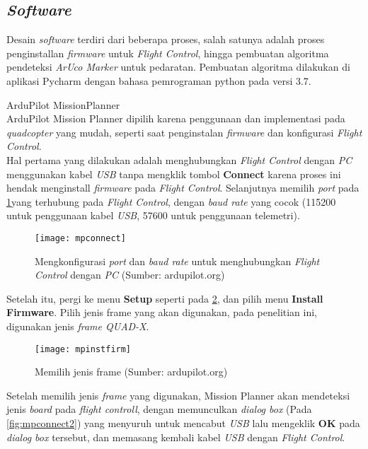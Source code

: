 \subsection{\textit{Software}}
Desain \textit{software} terdiri dari beberapa proses, salah satunya adalah proses  penginstallan \textit{firmware} untuk \textit{Flight Control}, hingga pembuatan algoritma pendeteksi \textit{ArUco Marker} untuk pedaratan. Pembuatan algoritma dilakukan di aplikasi Pycharm dengan bahasa pemrograman python pada versi 3.7.
\begin{packed_enum}
	\item ArduPilot MissionPlanner
	\\ ArduPilot Mission Planner dipilih karena penggunaan dan implementasi pada \textit{quadcopter} yang mudah, seperti saat penginstalan \textit{firmware} dan konfigurasi \textit{Flight Control}.
	\\ Hal pertama yang dilakukan adalah menghubungkan \textit{Flight Control} dengan \textit{PC} menggunakan kabel \textit{USB} tanpa mengklik tombol \textbf{Connect} karena proses ini hendak menginstall \textit{firmware} pada \textit{Flight Control}. Selanjutnya memilih \textit{port} pada \cref{fig:mpconnect}yang terhubung pada \textit{Flight Control}, dengan \textit{baud rate} yang cocok (115200 untuk penggunaan kabel \textit{USB}, 57600 untuk penggunaan telemetri).
		
	\begin{figure}[H]
		\centering
		\texttt{[image: mpconnect]}
		\caption{Mengkonfigurasi \textit{port} dan \textit{baud rate} untuk menghubungkan \textit{Flight Control} dengan \textit{PC} (Sumber: ardupilot.org)}
		\label{fig:mpconnect}
	\end{figure}
	
	Setelah itu, pergi ke menu \textbf{Setup} seperti pada \cref{fig:mpinstfirm}, dan pilih menu \textbf{Install Firmware}. Pilih jenis frame yang akan digunakan, pada penelitian ini, digunakan jenis \textit{frame QUAD-X}.
	
	\begin{figure}[H]
		\centering
		\texttt{[image: mpinstfirm]}
		\caption{Memilih jenis frame (Sumber: ardupilot.org)}
		\label{fig:mpinstfirm}
	\end{figure}
	
	Setelah memilih jenis \textit{frame} yang digunakan, Mission Planner akan mendeteksi jenis \textit{board} pada \textit{flight controll}, dengan memunculkan \textit{dialog box} (Pada \cref{fig:mpconnect2}) yang menyuruh untuk mencabut \textit{USB} lalu mengeklik \textbf{OK} pada \textit{dialog box} tersebut, dan memasang kembali kabel \textit{USB} dengan \textit{Flight Control}.
	

\end{packed_enum}
